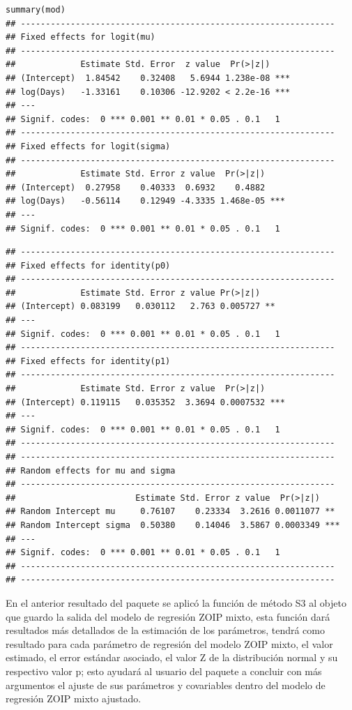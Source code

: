 \begin{verbatim}
summary(mod)
## ---------------------------------------------------------------
## Fixed effects for logit(mu) 
## ---------------------------------------------------------------
##             Estimate Std. Error  z value  Pr(>|z|)    
## (Intercept)  1.84542    0.32408   5.6944 1.238e-08 ***
## log(Days)   -1.33161    0.10306 -12.9202 < 2.2e-16 ***
## ---
## Signif. codes:  0 *** 0.001 ** 0.01 * 0.05 . 0.1   1
## ---------------------------------------------------------------
## Fixed effects for logit(sigma) 
## ---------------------------------------------------------------
##             Estimate Std. Error z value  Pr(>|z|)    
## (Intercept)  0.27958    0.40333  0.6932    0.4882    
## log(Days)   -0.56114    0.12949 -4.3335 1.468e-05 ***
## ---
## Signif. codes:  0 *** 0.001 ** 0.01 * 0.05 . 0.1   1
\end{verbatim}
\begin{verbatim}
## ---------------------------------------------------------------
## Fixed effects for identity(p0) 
## ---------------------------------------------------------------
##             Estimate Std. Error z value Pr(>|z|)   
## (Intercept) 0.083199   0.030112   2.763 0.005727 **
## ---
## Signif. codes:  0 *** 0.001 ** 0.01 * 0.05 . 0.1   1
## ---------------------------------------------------------------
## Fixed effects for identity(p1) 
## ---------------------------------------------------------------
##             Estimate Std. Error z value  Pr(>|z|)    
## (Intercept) 0.119115   0.035352  3.3694 0.0007532 ***
## ---
## Signif. codes:  0 *** 0.001 ** 0.01 * 0.05 . 0.1   1
## ---------------------------------------------------------------
## ---------------------------------------------------------------
## Random effects for mu and sigma 
## ---------------------------------------------------------------
##                        Estimate Std. Error z value  Pr(>|z|)    
## Random Intercept mu     0.76107    0.23334  3.2616 0.0011077 ** 
## Random Intercept sigma  0.50380    0.14046  3.5867 0.0003349 ***
## ---
## Signif. codes:  0 *** 0.001 ** 0.01 * 0.05 . 0.1   1
## ---------------------------------------------------------------
## ---------------------------------------------------------------
\end{verbatim}

En el anterior resultado del paquete  se aplic\'{o} la funci\'{o}n de m\'{e}todo S3  al objeto que guardo la salida del modelo de regresi\'{o}n ZOIP mixto, esta funci\'{o}n dar\'{a} resultados m\'{a}s detallados de la estimaci\'{o}n de los par\'{a}metros, tendr\'{a} como resultado para cada par\'{a}metro de regresi\'{o}n del modelo ZOIP mixto, el valor estimado, el error est\'{a}ndar asociado, el valor Z de la distribuci\'{o}n normal y su respectivo valor p; esto ayudar\'{a} al usuario del paquete  a concluir con m\'{a}s argumentos el ajuste de sus par\'{a}metros y covariables dentro del modelo de regresi\'{o}n ZOIP mixto ajustado.
 
